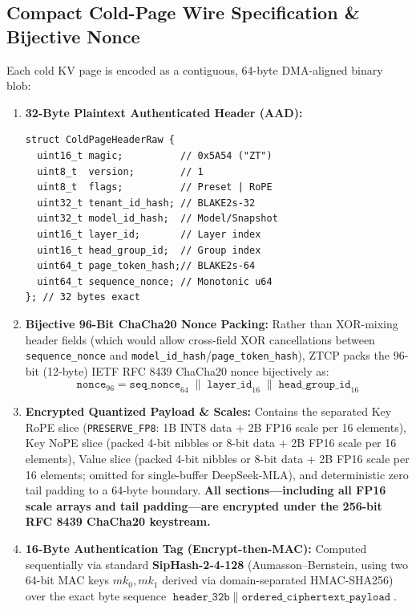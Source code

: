 \documentclass[10pt,twocolumn]{article}
\begin{document}
\subsection{Compact Cold-Page Wire Specification \& Bijective Nonce}
Each cold KV page is encoded as a contiguous, 64-byte DMA-aligned binary blob:
\begin{enumerate}
    \item \textbf{32-Byte Plaintext Authenticated Header (AAD):}
    {\footnotesize
    \begin{verbatim}
struct ColdPageHeaderRaw {
  uint16_t magic;          // 0x5A54 ("ZT")
  uint8_t  version;        // 1
  uint8_t  flags;          // Preset | RoPE
  uint32_t tenant_id_hash; // BLAKE2s-32
  uint32_t model_id_hash;  // Model/Snapshot
  uint16_t layer_id;       // Layer index
  uint16_t head_group_id;  // Group index
  uint64_t page_token_hash;// BLAKE2s-64
  uint64_t sequence_nonce; // Monotonic u64
}; // 32 bytes exact
    \end{verbatim}
    }
    \item \textbf{Bijective 96-Bit ChaCha20 Nonce Packing:} Rather than XOR-mixing header fields (which would allow cross-field XOR cancellations between \texttt{sequence\_nonce} and \texttt{model\_id\_hash}/\texttt{page\_token\_hash}), ZTCP packs the 96-bit (12-byte) IETF RFC 8439 ChaCha20 nonce bijectively as:
    {\footnotesize
    \begin{equation*}
        \texttt{nonce}_{96} = \texttt{seq\_nonce}_{64} \;\|\; \texttt{layer\_id}_{16} \;\|\; \texttt{head\_group\_id}_{16}
    \end{equation*}
    }
    \item \textbf{Encrypted Quantized Payload \& Scales:} Contains the separated Key RoPE slice (\texttt{PRESERVE\_FP8}: 1B INT8 data + 2B FP16 scale per 16 elements), Key NoPE slice (packed 4-bit nibbles or 8-bit data + 2B FP16 scale per 16 elements), Value slice (packed 4-bit nibbles or 8-bit data + 2B FP16 scale per 16 elements; omitted for single-buffer DeepSeek-MLA), and deterministic zero tail padding to a 64-byte boundary. \textbf{All sections---including all FP16 scale arrays and tail padding---are encrypted under the 256-bit RFC 8439 ChaCha20 keystream.}
    \item \textbf{16-Byte Authentication Tag (Encrypt-then-MAC):} Computed sequentially via standard \textbf{SipHash-2-4-128} (Aumasson--Bernstein, using two 64-bit MAC keys $mk_0, mk_1$ derived via domain-separated HMAC-SHA256) over the exact byte sequence $\texttt{header\_32b} \;\|\; \texttt{ordered\_ciphertext\_payload}$.
\end{enumerate}
\end{document}
